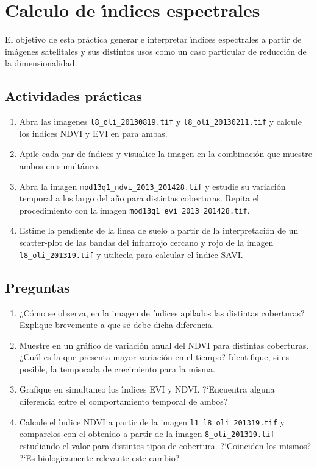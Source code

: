 \documentclass[hidelinks,12pt]{article}
\begin{document}
\section{Calculo de \'{\i}ndices espectrales}
El objetivo de esta práctica generar e interpretar \'{\i}ndices espectrales
a partir de  imágenes satelitales y sus distintos usos como un caso
particular de reducci\'on de la dimensionalidad.

\subsection{Actividades pr\'acticas}
\begin{enumerate}
    \item Abra las imagenes \texttt{l8\_oli\_20130819.tif} y 
        \texttt{l8\_oli\_20130211.tif} y calcule los indices NDVI y EVI en 
        para ambas.
    \item Apile cada par de  índices y visualice la imagen en la combinación que 
        muestre ambos en simultáneo.
    \item Abra la imagen \texttt{mod13q1\_ndvi\_2013\_2014\-28.tif} y 
        estudie su variaci\'on temporal a los largo del a\~no para distintas 
        coberturas. Repita el procedimiento con la imagen 
        \texttt{mod13q1\_evi\_2013\_2014\-28.tif}.
    \item Estime la pendiente de la linea de suelo a partir de la
        interpretaci\'on de un scatter-plot de las bandas del infrarrojo cercano
        y rojo de la imagen \texttt{l8\_oli\_2013\-19.tif} y utilicela para
        calcular el \'{\i}ndice SAVI\@.
\end{enumerate}

\subsection{Preguntas}
\begin{enumerate}
    \item ¿Cómo se observa, en la imagen de índices apilados las distintas
        coberturas? Explique brevemente a que se debe dicha diferencia.
    \item Muestre en un gráfico de variación anual del NDVI para distintas coberturas.
        ¿Cuál es la que presenta mayor variaci\'on en el tiempo? Identifique, si es
        posible, la temporada de crecimiento para la misma.
    \item Grafique en simultaneo los \'{\i}ndices EVI y NDVI. ?`Encuentra alguna
        diferencia entre el comportamiento temporal de ambos? 
    \item Calcule el \'{\i}ndice NDVI a partir de la imagen
        \texttt{l1\_l8\_oli\_2013\-19.tif}
        y comparelos con el obtenido a partir de la
        imagen \texttt{8\_oli\_2013\-19.tif} estudiando el valor para distintos
        tipos de cobertura. ?`Coinciden los mismos? ?`Es biologicamente relevante
        este cambio?
\end{enumerate}
\newpage
\end{document}
